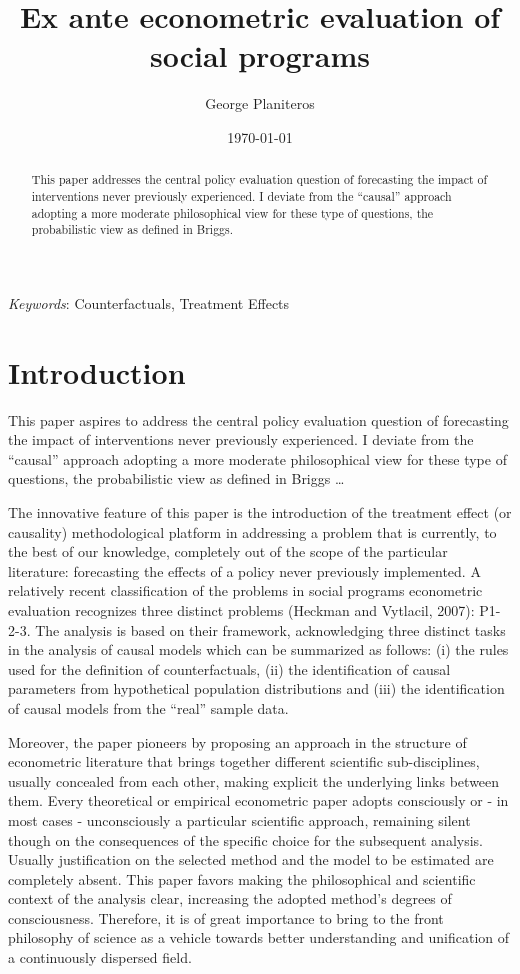 \documentclass[12pt]{article}
\theoremstyle{definition}
\renewcommand{\baselinestretch}{1.5} %
\begin{document}
\begin{titlepage}
\title{Ex ante econometric evaluation of social programs}
\author{George Planiteros}
\date{\today}
\renewcommand{\baselinestretch}{1.2} %
\maketitle
\begin{abstract}
\noindent This paper addresses the central policy evaluation question of forecasting the impact of interventions never previously experienced. I deviate from the “causal” approach adopting a more moderate philosophical view for these type of questions, the probabilistic view as defined in Briggs.
\end{abstract}

\noindent \textit{Keywords}: Counterfactuals, Treatment Effects
\end{titlepage}

\section{Introduction}

This paper aspires to address the central policy evaluation question of forecasting the impact of interventions never previously experienced. I deviate from the “causal” approach adopting a more moderate philosophical view for these type of questions, the probabilistic view as defined in Briggs …
	
The innovative feature of this paper is the introduction of the treatment effect (or causality) methodological platform in addressing a problem that is currently, to the best of our knowledge, completely out of the scope of the particular literature: forecasting the effects of a policy never previously implemented. A relatively recent classification of the problems in social programs econometric evaluation recognizes three distinct problems (Heckman and Vytlacil, 2007): P1-2-3. The analysis is based on their framework, acknowledging three distinct tasks in the analysis of causal models which can be summarized as follows: (i) the rules used for the definition of counterfactuals, (ii) the identification of causal parameters from hypothetical population distributions and (iii) the identification of causal models from the “real” sample data.

Moreover, the paper pioneers by proposing an approach in the structure of econometric literature that brings together different scientific sub-disciplines, usually concealed from each other, making explicit the underlying links between them. Every theoretical or empirical econometric paper adopts consciously or - in most cases - unconsciously a particular scientific approach, remaining silent though on the consequences of the specific choice for the subsequent analysis. Usually justification on the selected method and the model to be estimated are completely absent. This paper favors making the philosophical and scientific context of the analysis clear, increasing the adopted method’s degrees of consciousness. Therefore, it is of great importance to bring to the front philosophy of science as a vehicle towards better understanding and unification of a continuously dispersed field.
\end{document}
